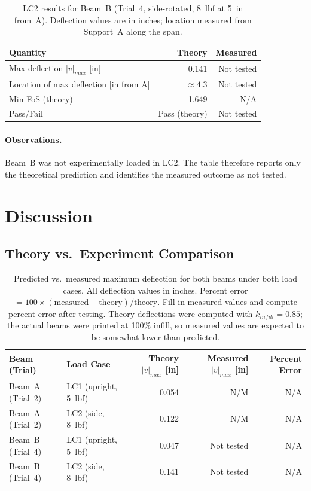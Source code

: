 \documentclass[11pt,letterpaper]{article}
\begin{document}
\begin{table}[H]
\centering
\caption{LC2 results for Beam~B (Trial~4, side-rotated, 8~lbf at 5~in from~A).
Deflection values are in inches; location measured from Support~A along the span.}
\label{tab:testB_lc2}
\begin{tabular}{lrr}
\toprule
Quantity & Theory & Measured \\
\midrule
Max deflection $|v|_{max}$ [in] & 0.141 & Not tested \\
Location of max deflection [in from A] & $\approx 4.3$ & Not tested \\
Min FoS (theory)              & 1.649 & N/A \\
Pass/Fail                     & Pass (theory) & Not tested \\
\bottomrule
\end{tabular}
\end{table}

\paragraph{Observations.}
Beam~B was not experimentally loaded in LC2.  The table therefore reports only
the theoretical prediction and identifies the measured outcome as not tested.


\section{Discussion}
\label{sec:discussion}

\subsection{Theory vs.\ Experiment Comparison}

\begin{table}[H]
\centering
\caption{Predicted vs.\ measured maximum deflection for both beams under
both load cases.  All deflection values in inches.  Percent error $= 100\times
(\text{measured} - \text{theory})/\text{theory}$.
Fill in measured values and compute percent error after testing.
Theory deflections were computed with $k_{infill}=0.85$; the actual beams
were printed at 100\% infill, so measured values are expected to be somewhat
lower than predicted.}
\label{tab:comparison}
\begin{tabular}{llrrr}
\toprule
Beam (Trial) & Load Case & Theory $|v|_{max}$ [in] & Measured $|v|_{max}$ [in] & Percent Error \\
\midrule
Beam~A (Trial~2) & LC1 (upright, 5~lbf)    & 0.054 & N/M & N/A \\
Beam~A (Trial~2) & LC2 (side, 8~lbf)       & 0.122 & N/M & N/A \\
Beam~B (Trial~4) & LC1 (upright, 5~lbf)    & 0.047 & Not tested & N/A \\
Beam~B (Trial~4) & LC2 (side, 8~lbf)       & 0.141 & Not tested & N/A \\
\bottomrule
\end{tabular}
\end{table}
\end{document}
